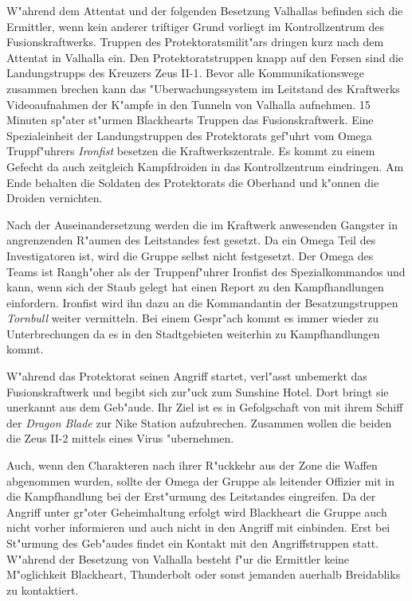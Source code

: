 
W"ahrend dem Attentat und der folgenden Besetzung Valhallas befinden sich die Ermittler, wenn kein anderer triftiger Grund vorliegt im Kontrollzentrum des Fusionskraftwerks. Truppen des Protektoratsmilit"ars dringen kurz nach dem Attentat in Valhalla ein. Den Protektoratstruppen knapp auf den Fersen sind die Landungstrupps des Kreuzers Zeus II-1. Bevor alle Kommunikationswege zusammen brechen kann das "Uberwachungssystem im Leitstand des Kraftwerks Videoaufnahmen der K"ampfe in den Tunneln von Valhalla aufnehmen. 15 Minuten sp"ater st"urmen Blackhearts Truppen das Fusionskraftwerk. Eine Spezialeinheit der Landungstruppen des Protektorats gef"uhrt vom Omega Truppf"uhrers \emph{Ironfist} besetzen die Kraftwerkszentrale. Es kommt zu einem Gefecht da auch zeitgleich Kampfdroiden in das Kontrollzentrum eindringen. Am Ende behalten die Soldaten des Protektorats die Oberhand und k"onnen die Droiden vernichten. 

Nach der Auseinandersetzung werden die im Kraftwerk anwesenden Gangster in angrenzenden R"aumen des Leitstandes fest gesetzt. Da ein Omega Teil des Investigatoren ist, wird die Gruppe selbst nicht festgesetzt. Der Omega des Teams ist Rangh"oher als der Truppenf"uhrer Ironfist des Spezialkommandos und kann, wenn sich der Staub gelegt hat einen Report zu den Kampfhandlungen einfordern. Ironfist wird ihn dazu an die Kommandantin der Besatzungstruppen \emph{Tornbull} weiter vermitteln. Bei einem Gespr"ach kommt es immer wieder zu Unterbrechungen da es in den Stadtgebieten weiterhin zu Kampfhandlungen kommt.

W"ahrend das Protektorat seinen Angriff startet, verl"asst \xl{} unbemerkt das Fusionskraftwerk und begibt sich zur"uck zum Sunshine Hotel. Dort bringt sie \ml{} unerkannt aus dem Geb"aude. Ihr Ziel ist es in Gefolgschaft von \ml{} mit ihrem Schiff der \emph{Dragon Blade} zur Nike Station aufzubrechen. Zusammen wollen die beiden die Zeus II-2 mittels eines Virus "ubernehmen. 

\begin{remarks}
	Auch, wenn den Charakteren nach ihrer R"uckkehr aus der Zone die Waffen abgenommen wurden, sollte der Omega der Gruppe als leitender Offizier mit in die Kampfhandlung bei der Erst"urmung des Leitstandes eingreifen. Da der Angriff unter gr"o\3ter Geheimhaltung erfolgt wird Blackheart die Gruppe auch nicht vorher informieren und auch nicht in den Angriff mit einbinden. Erst bei St"urmung des Geb"audes findet ein Kontakt mit den Angriffstruppen statt. W"ahrend der Besetzung von Valhalla besteht f"ur die Ermittler keine M"oglichkeit Blackheart, Thunderbolt oder sonst jemanden au\3erhalb Breidabliks zu kontaktiert.
\end{remarks}
